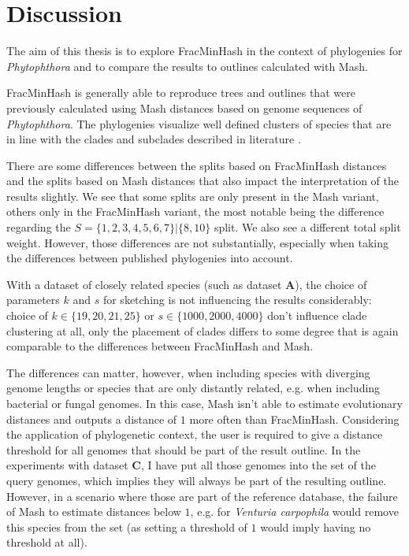 
\chapter{Discussion}
  \label{sec:diss}

The aim of this thesis is to explore FracMinHash in the context of phylogenies
for \textit{Phytophthora} and to compare the results to outlines calculated with
Mash.

FracMinHash is generally able to reproduce trees and outlines that were
previously calculated using Mash distances based on genome sequences of
\textit{Phytophthora}. The phylogenies visualize well defined clusters of
species that are in line with the clades and subclades described in literature
\cite{abadPhytophthoraTaxonomicPhylogenetic2023a,yangExpandedPhylogenyGenus2017}.

There are some differences between the splits based on FracMinHash distances and
the splits based on Mash distances that also impact the interpretation of the
results slightly. We see that some splits are only present in the Mash variant,
others only in the FracMinHash variant, the most notable being the difference
regarding the $S = \{1, 2, 3, 4, 5, 6, 7\}|\{8, 10\}$ split. We also see a
different total split weight. However, those differences are not substantially,
especially when taking the differences between published phylogenies into
account. 

With a dataset of closely related species (such as dataset \textbf{A}), the
choice of
parameters $k$ and $s$ for sketching is not influencing the results
considerably: choice of $k \in \{19, 20, 21, 25\}$ or $s \in \{1000, 2000,
4000\}$ don't influence clade clustering at all, only the placement of clades
differs to some degree that is again comparable to the differences between
FracMinHash and Mash.

The differences can matter, however, when including species with diverging
genome lengths or species that are only distantly related, e.g. when including
bacterial or fungal genomes. In this case, Mash isn't able to estimate
evolutionary distances and outputs a distance of $1$ more often than
FracMinHash. Considering the application of phylogenetic context, the user is
required to give a distance threshold for all genomes that should be part of the
result outline. In the experiments with dataset \textbf{C}, I have put all those
genomes into the set of the query genomes, which implies they will always be
part of the resulting outline. However, in a scenario where those are part of
the reference database, the failure of Mash to estimate distances below $1$,
e.g. for \textit{Venturia carpophila} would remove this species from the set (as
setting a threshold of $1$ would imply having no threshold at all).

